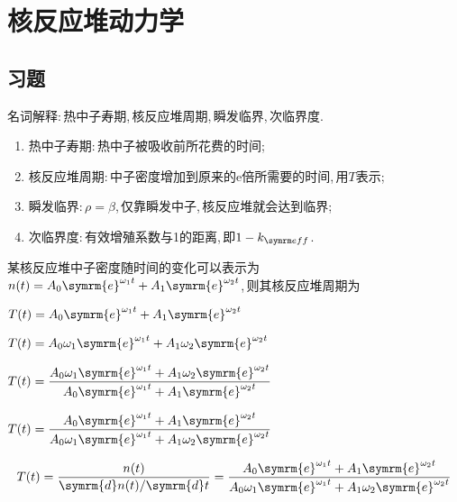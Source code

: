 \chapter{核反应堆动力学}
\section*{习题}

\begin{exercise}
    名词解释:\,热中子寿期,\,核反应堆周期,\,瞬发临界,\,次临界度.\,
    \begin{solution}
        \begin{enumerate}
            \item 热中子寿期:\,热中子被吸收前所花费的时间;\,
            \item 核反应堆周期:\,中子密度增加到原来的e倍所需要的时间,\,用$T$表示;\,
            \item 瞬发临界:\,$\rho = \beta$,\,仅靠瞬发中子,\,核反应堆就会达到临界;\,
            \item 次临界度:\,有效增殖系数与1的距离,\,即$1 - \keff$.\,
        \end{enumerate}
    \end{solution}
\end{exercise}

\begin{exercise}
    某核反应堆中子密度随时间的变化可以表示为$n(t) = A_0 \symrm{e}^{\omega_1 t} + A_1 \symrm{e}^{\omega_2 t}$,\,则其核反应堆周期为\xparen
    \begin{xchoices}[showanswer=true]
        \item $T(t) = A_0 \symrm{e}^{\omega_1 t} + A_1 \symrm{e}^{\omega_2 t}$
        \item $T(t) = A_0 \omega_1 \symrm{e}^{\omega_1 t} + A_1 \omega_2 \symrm{e}^{\omega_2 t}$
        \item $\displaystyle T(t) = \frac{A_0 \omega_1 \symrm{e}^{\omega_1 t} + A_1 \omega_2 \symrm{e}^{\omega_2 t}}{A_0 \symrm{e}^{\omega_1 t} + A_1 \symrm{e}^{\omega_2 t}}$
        \item* $\displaystyle T(t) = \frac{A_0 \symrm{e}^{\omega_1 t} + A_1 \symrm{e}^{\omega_2 t}}{A_0 \omega_1 \symrm{e}^{\omega_1 t} + A_1 \omega_2 \symrm{e}^{\omega_2 t}}$
    \end{xchoices}
    
    \vspace*{2em}
    
    \begin{solution}
        \begin{equation*}
            T(t) = \frac{n(t)}{\symrm{d}n(t)/\symrm{d}t} = \frac{A_0 \symrm{e}^{\omega_1 t} + A_1 \symrm{e}^{\omega_2 t}}{A_0 \omega_1 \symrm{e}^{\omega_1 t} + A_1 \omega_2 \symrm{e}^{\omega_2 t}}
        \end{equation*}
    \end{solution}
\end{exercise}

